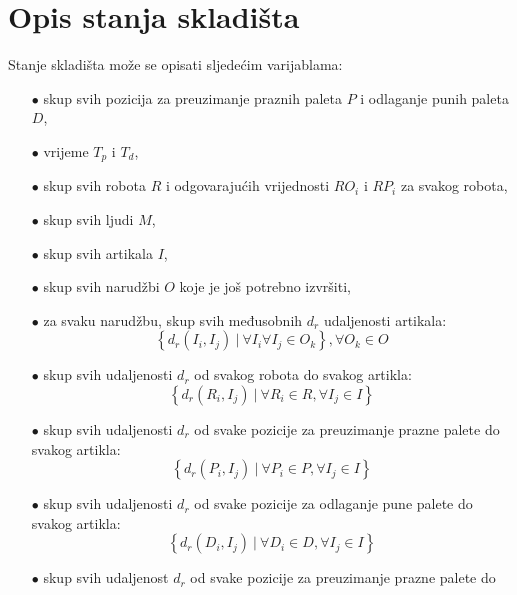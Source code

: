 \documentclass[times, utf8, seminar]{fer}
\begin{document}
\section{Opis stanja skladišta}
Stanje skladišta može se opisati sljedećim varijablama:
\begin{itemize}
    \item[$\bullet$] skup svih pozicija za preuzimanje praznih paleta $P$ i odlaganje punih paleta $D$,
    \item[$\bullet$] vrijeme $T_p$ i $T_d$,
    \item[$\bullet$] skup svih robota $R$ i odgovarajućih vrijednosti $RO_{i}$ i $RP_{i}$ za svakog robota,
    \item[$\bullet$] skup svih ljudi $M$,
    \item[$\bullet$] skup svih artikala $I$,
    \item[$\bullet$] skup svih narudžbi $O$ koje je još potrebno izvršiti,
    \item[$\bullet$] za svaku narudžbu, skup svih međusobnih $d_r$ udaljenosti artikala:
                \begin{equation}
                \label{state-set-01}
                    \left\{ d_r(I_i, I_j)\ |\ \forall I_i \forall I_j \in O_k \right\}, \forall O_k \in O
                \end{equation}
    \item[$\bullet$] skup svih udaljenosti $d_r$ od svakog robota do svakog artikla:
                \begin{equation}
                \label{state-set-02}
                    \left\{ d_r(R_i, I_j)\ |\ \forall R_i \in R, \forall I_j \in I\right\}
                \end{equation}
    \item[$\bullet$] skup svih udaljenosti $d_r$ od svake pozicije za preuzimanje prazne palete do
                     svakog artikla:
                \begin{equation}
                    \left\{d_r(P_i, I_j)\ |\ \forall P_i \in P, \forall I_j \in I\right\}
                \end{equation}
    \item[$\bullet$] skup svih udaljenosti $d_r$ od svake pozicije za odlaganje pune palete do
                     svakog artikla:
                \begin{equation}
                    \left\{d_r(D_i, I_j)\ |\ \forall D_i \in D, \forall I_j \in I\right\}
                \end{equation}
    \item[$\bullet$] skup svih udaljenost $d_r$ od svake pozicije za preuzimanje prazne palete do

\end{itemize}
\end{document}
